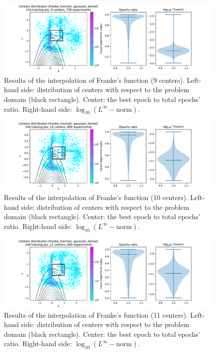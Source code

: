 \documentclass[12pt]{report} %
\begin{document}
\begin{figure}[H]
  \includegraphics[width=\textwidth, trim={2cm 0 2.8cm 0}, clip=true]{imagenes/experiments/2d/franke_interpolation/tr12_c9_franke_function_gaussian_kernel.pdf}
  \caption{Results of the interpolation of Franke's function (9 centers).
    Left-hand side: distribution of centers with respect to the problem domain (black rectangle). Center: the best epoch to total epochs' ratio.
    Right-hand side: $\log_{10}(L^\infty-\text{norm})$.}
  \label{fig:franke-tr12-c9}
\end{figure}
\begin{figure}[H]
  \includegraphics[width=\textwidth, trim={2cm 0 2.8cm 0}, clip=true]{imagenes/experiments/2d/franke_interpolation/tr12_c10_franke_function_gaussian_kernel.pdf}
  \caption{Results of the interpolation of Franke's function (10 centers).
    Left-hand side: distribution of centers with respect to the problem domain (black rectangle). Center: the best epoch to total epochs' ratio.
    Right-hand side: $\log_{10}(L^\infty-\text{norm})$.}
  \label{fig:franke-tr12-c10-old}
\end{figure}
\begin{figure}[H]
  \includegraphics[width=\textwidth, trim={2cm 0 2.8cm 0}, clip=true]{imagenes/experiments/2d/franke_interpolation/tr12_c11_franke_function_gaussian_kernel.pdf}
  \caption{Results of the interpolation of Franke's function (11 centers).
    Left-hand side: distribution of centers with respect to the problem domain (black rectangle). Center: the best epoch to total epochs' ratio.
    Right-hand side: $\log_{10}(L^\infty-\text{norm})$.}
  \label{fig:franke-tr12-c11}
\end{figure}
\end{document}
